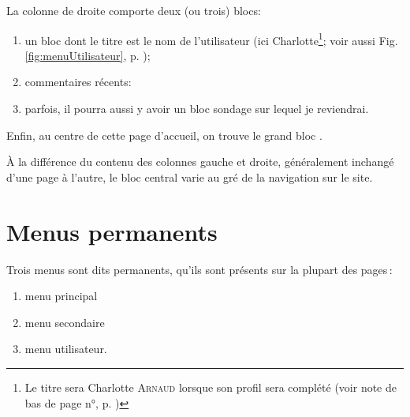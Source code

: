 
La colonne de droite comporte deux (ou trois) blocs: 
\begin{enumerate}
    \item un bloc dont le titre est le nom de l’utilisateur (ici Charlotte\footnote{Le titre sera Charlotte \textsc{Arnaud} lorsque son profil sera complété (voir note de bas de page n°\thenoteProfilPasAJour, p. \pageref{page:profilPasAJour})}; voir aussi Fig. \ref{fig:menuUtilisateur}, p. \pageref{fig:menuUtilisateur});
    \item commentaires récents:
    \item parfois, il pourra aussi y avoir un bloc sondage sur lequel je reviendrai.
\end{enumerate}



Enfin, au centre de cette page d'accueil, on trouve le grand bloc .

À la différence du contenu des colonnes gauche et droite, généralement inchangé d'une page à l'autre, le bloc central varie au gré de la navigation sur le site.



\section{Menus permanents}

Trois menus sont dits permanents, \cad{} qu’ils sont présents sur la plupart des pages\,:
\begin{enumerate}
    \item menu principal\;
    \item menu secondaire\;
    \item menu utilisateur.
\end{enumerate}

